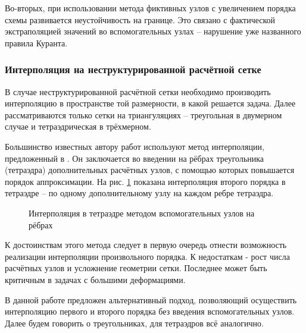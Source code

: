 Во-вторых, при использовании метода фиктивных узлов с увеличением порядка схемы развивается неустойчивость на границе. Это связано с фактической экстраполяцией значений во вспомогательных узлах -- нарушение уже названного правила Куранта.


\subsubsection{Интерполяция на неструктурированной расчётной сетке}
В случае неструктурированной расчётной сетки необходимо производить интерполяцию в пространстве той размерности, в какой решается задача. Далее рассматриваются только сетки на триангуляциях -- треугольная в двумерном случае и тетраэдрическая в трёхмерном.

Большинство известных автору работ используют метод интерполяции, предложенный в \cite{chelnokov_agapov}. Он заключается во введении на рёбрах треугольника (тетраэдра) дополнительных расчётных узлов, с помощью которых повышается порядок аппроксимации. На рис. \ref{pic:triangle-interp} показана интерполяция второго порядка в тетраэдре -- по одному дополнительному узлу на каждом ребре тетраэдра.

\begin{figure}[H]
	\caption{Интерполяция в тетраэдре методом вспомогательных узлов на рёбрах}
	\label{pic:triangle-interp}
\end{figure}

К достоинствам этого метода следует в первую очередь отнести возможность реализации интерполяции произвольного порядка. К недостаткам - рост числа расчётных узлов и усложнение геометрии сетки. Последнее может быть критичным в задачах с большими деформациями.

В данной работе предложен альтернативный подход, позволяющий осуществить интерполяцию первого и второго порядка без введения вспомогательных узлов. Далее будем говорить о треугольниках, для тетраэдров всё аналогично. 

